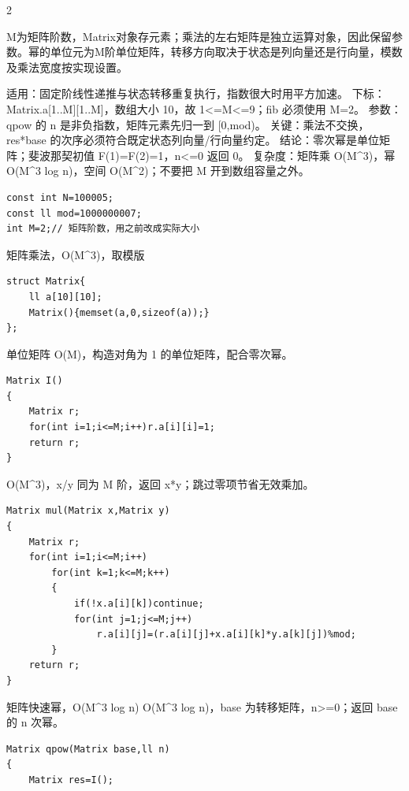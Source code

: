 \documentclass[UTF8,fontset=fandol,a4paper,twoside]{ctexart}
\newcommand{\note}[1]{{\fontsize{10}{12}\selectfont #1\par}}
\begin{document}
\begin{multicols}{2}
\note{M为矩阵阶数，Matrix对象存元素；乘法的左右矩阵是独立运算对象，因此保留参数。幂的单位元为M阶单位矩阵，转移方向取决于状态是列向量还是行向量，模数及乘法宽度按实现设置。}
\note{适用：固定阶线性递推与状态转移重复执行，指数很大时用平方加速。 下标：Matrix.\allowbreak{}a[\allowbreak{}1.\allowbreak{}.\allowbreak{}M]\allowbreak{}[\allowbreak{}1.\allowbreak{}.\allowbreak{}M]\allowbreak{}，数组大小 10，故 1<\allowbreak{}=\allowbreak{}M<\allowbreak{}=\allowbreak{}9；fib 必须使用 M=\allowbreak{}2。 参数：qpow 的 n 是非负指数，矩阵元素先归一到 [\allowbreak{}0,\allowbreak{}mod)\allowbreak{}。 关键：乘法不交换，res*base 的次序必须符合既定状态列向量/\allowbreak{}行向量约定。 结论：零次幂是单位矩阵；斐波那契初值 F(\allowbreak{}1)\allowbreak{}=\allowbreak{}F(\allowbreak{}2)\allowbreak{}=\allowbreak{}1，n<\allowbreak{}=\allowbreak{}0 返回 0。 复杂度：矩阵乘 O(\allowbreak{}M\textasciicircum{}3)\allowbreak{}，幂 O(\allowbreak{}M\textasciicircum{}3 log n)\allowbreak{}，空间 O(\allowbreak{}M\textasciicircum{}2)\allowbreak{}；不要把 M 开到数组容量之外。}
\begin{lstlisting}
const int N=100005;
const ll mod=1000000007;
int M=2;// 矩阵阶数，用之前改成实际大小
\end{lstlisting}
\note{矩阵乘法，O(\allowbreak{}M\textasciicircum{}3)\allowbreak{}，取模版}
\begin{lstlisting}
struct Matrix{
    ll a[10][10];
    Matrix(){memset(a,0,sizeof(a));}
};
\end{lstlisting}
\note{单位矩阵 O(\allowbreak{}M)\allowbreak{}，构造对角为 1 的单位矩阵，配合零次幂。}
\begin{lstlisting}
Matrix I()
{
    Matrix r;
    for(int i=1;i<=M;i++)r.a[i][i]=1;
    return r;
}
\end{lstlisting}
\note{O(\allowbreak{}M\textasciicircum{}3)\allowbreak{}，x/\allowbreak{}y 同为 M 阶，返回 x*y；跳过零项节省无效乘加。}
\begin{lstlisting}
Matrix mul(Matrix x,Matrix y)
{
    Matrix r;
    for(int i=1;i<=M;i++)
        for(int k=1;k<=M;k++)
        {
            if(!x.a[i][k])continue;
            for(int j=1;j<=M;j++)
                r.a[i][j]=(r.a[i][j]+x.a[i][k]*y.a[k][j])%mod;
        }
    return r;
}
\end{lstlisting}
\note{矩阵快速幂，O(\allowbreak{}M\textasciicircum{}3 log n)\allowbreak{} O(\allowbreak{}M\textasciicircum{}3 log n)\allowbreak{}，base 为转移矩阵，n>\allowbreak{}=\allowbreak{}0；返回 base 的 n 次幂。}
\begin{lstlisting}
Matrix qpow(Matrix base,ll n)
{
    Matrix res=I();

\end{lstlisting}
\end{multicols}
\end{document}
